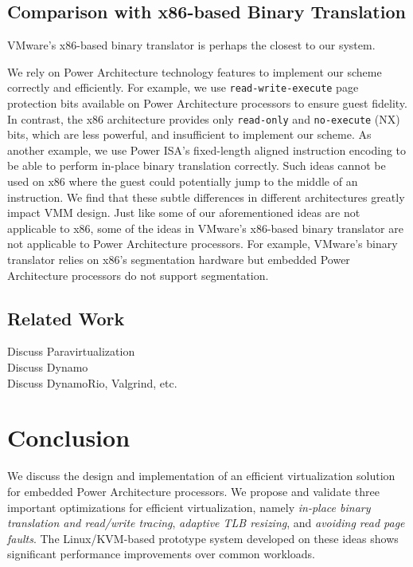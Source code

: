 \documentclass[10pt,twocolumn]{article}
\begin{document}
\subsection{Comparison with x86-based Binary Translation}
VMware's x86-based binary translator\cite{agesen:comparison} is perhaps the closest
to our system.

We rely on Power Architecture technology features to implement our
scheme correctly and efficiently. For example, we use
{\tt read-write-execute} page protection bits available on Power Architecture processors to ensure guest
fidelity. In contrast, the x86 architecture provides only {\tt read-only} and
{\tt no-execute} (NX) bits, which are less powerful, and insufficient
to implement our scheme. As another
example, we use Power ISA's fixed-length aligned instruction encoding to be able to
perform in-place binary translation correctly. Such ideas cannot be used
on x86 where the guest could potentially jump to the middle of an instruction.
We find that these subtle
differences in different architectures greatly impact VMM design. Just like some
of our aforementioned ideas are not applicable to
x86, some of the ideas in VMware's x86-based binary translator
are not applicable to Power Architecture processors. For example, VMware's binary translator
relies on x86's segmentation hardware but embedded Power Architecture processors do not
support segmentation.

\subsection{Related Work}
Discuss Paravirtualization\\
Discuss Dynamo\\
Discuss DynamoRio, Valgrind, etc.\\
\section{Conclusion}
We discuss the design and implementation of an efficient virtualization solution
for embedded Power Architecture processors. We propose and validate three important optimizations
for efficient virtualization, namely {\em in-place binary translation and read/write
tracing}, {\em adaptive TLB resizing}, and {\em avoiding read page faults}. 
The Linux/KVM-based prototype system developed on these ideas shows significant
performance improvements over common workloads.


\end{document}
